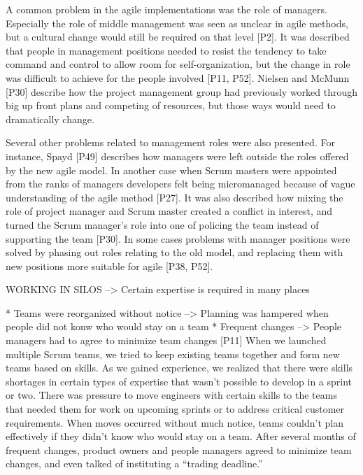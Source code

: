 \documentclass[preprint,authoryear,12pt]{elsarticle}
\begin{document}

A common problem in the agile implementations was the role of managers.
Especially the role of middle management was seen as unclear in agile
methods, but a cultural change would still be required on that level [P2].
It was described that people in management positions needed to resist the
tendency to take command and control to allow room for self-organization, but
the change in role was difficult to achieve for the people involved [P11, P52].
Nielsen and McMunn [P30] describe how the project management group had
previously worked through big up front plans and competing of resources, but
those ways would need to dramatically change.


Several other problems related to management roles were also presented. For
instance, Spayd [P49] describes how managers were left outside the roles offered
by the new agile model. In another case when Scrum masters were appointed from
the ranks of managers developers felt being micromanaged because of vague
understanding of the agile method [P27]. It was also described how mixing the
role of project manager and Scrum master created a conflict in interest, and
turned the Scrum manager's role into one of policing the team instead of
supporting the team [P30]. In some cases problems with manager positions were
solved by phasing out roles relating to the old model, and replacing them with
new positions more suitable for agile [P38, P52].




WORKING IN SILOS --> Certain expertise is required in many places

* Teams were reorganized without notice --> Planning was hampered when people did not konw who would stay on a team
* Frequent changes --> People managers had to agree to minimize team changes
[P11]
When we launched multiple Scrum teams, we tried to keep existing teams together
and form new teams based on skills.  As we gained experience, we realized that
there were skills shortages in certain types of expertise that wasn’t possible
to develop in a sprint or two. There was pressure to move engineers with certain
skills to the teams that needed them for work on upcoming sprints or to address
critical customer requirements.  When moves occurred without much notice, teams
couldn’t plan effectively if they didn’t know who would stay on a team.  After
several months of frequent changes, product owners and people managers agreed to
minimize team changes, and even talked of instituting a “trading deadline.”
\end{document}
